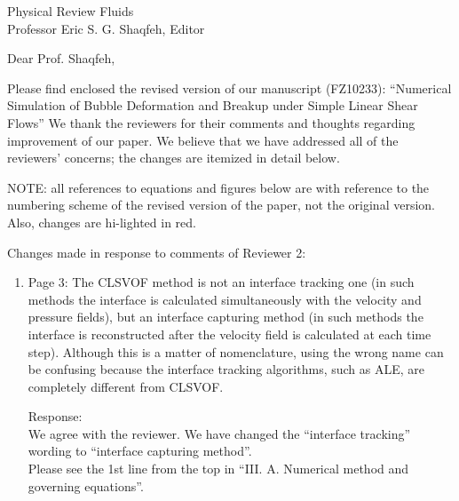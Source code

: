 \documentclass{letter}
\date{\today}
\begin{document}
\begin{letter}{
Physical Review Fluids\\
Professor Eric S. G. Shaqfeh, Editor\\}

\opening{Dear Prof. Shaqfeh,}

Please find enclosed the revised version of our manuscript (FZ10233):
``Numerical Simulation of Bubble Deformation and Breakup under 
Simple Linear Shear Flows''
We thank the reviewers for their comments and thoughts regarding improvement 
of our paper. We believe that we have addressed all of the reviewers’ 
concerns; the changes are itemized in detail below.


\par\noindent
NOTE: all references to equations and figures below are with
reference to the numbering scheme of the revised version of the paper,
not the original version.  Also, changes are hi-lighted in red.
\par\noindent

Changes made in response to comments of Reviewer 2: 
\begin{enumerate}
\item
\textsf
{Page 3: The CLSVOF method is not an interface tracking one (in such methods
the interface is calculated simultaneously with the velocity and pressure
fields), but an interface capturing method (in such methods the interface is
reconstructed after the velocity field is calculated at each time step).
Although this is a matter of nomenclature, using the wrong name can be
confusing because the interface tracking algorithms, such as ALE, are
completely different from CLSVOF.}
\vspace{3 mm}

Response: \\
We agree with the reviewer. We have changed the ``interface tracking''
wording to ``interface capturing method''.
\\
Please see the 1st line from the top in ``I\hspace{-1.2pt}I\hspace{-1.2pt}I. A. Numerical method and governing equations''.
\\


\end{enumerate}
\end{letter}
\end{document}
